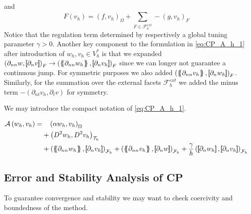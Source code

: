 and
\begin{equation}
\label{eq:CP_F_h}
F\left( v_{h} \right)  = \left( f, v_{h} \right) _{\Omega } +  \sum_ {F \in \mathcal{F}_{h} ^{ext}}^{} - \left(g, v_{h}  \right) _{F}
\end{equation}
Notice that the regulation term determined by respectively a global tuning parameter $\gamma >0 $. Another key component to the formulation
in \eqref{eq:CP_A_h_1} after introduction of $ w_{h}, v_{h} \in V^{*}_{h}$  is that we expanded $\left( \partial _{nn}w, \jump{ \partial _{n} v }  \right)_{F} \to \left( \mean{ \partial _{nn}w_{h} }  , \jump{ \partial _{n} v_{h} }  \right)_{F} $ since we can longer not guarantee a
continuous jump. For symmetric purposes we also added $ \left( \mean{ \partial _{nn} v_{h}}  , \jump{ \partial _{n} w_{h} }  \right)_{F} $. Similarly, for the summation over the external facets $\mathcal{F} _{h}^{ext}$ we added the minus term $- \left( \partial
_{nt} v_{h} , \partial _{t}v \right) $ for symmetry.

We may introduce the compact notation of \eqref{eq:CP_A_h_1}.

\begin{equation}
\label{eq:CP_A_h}
\begin{split}
\mathcal{A} \left( w_{h}, v_{h} \right)   =&
  \quad  \left( \alpha  w_{h}, v_{h} \right) _{\Omega }\\
&  +  \left( D^2 w_{h}, D^2v_{h} \right) _{\mathcal{T} _{h}} \\
 & +
  \left( \mean{  \partial _{n n} w_{h} }, \jump{ \partial _{n }v_{h}} \right)_{\mathcal{F}_{h}}  +
 \left( \mean{ \partial _{n n} v_{h} }, \jump{ \partial _{n}w }      \right)_{\mathcal{F}_{h}}
+ \frac{\gamma }{h}  \left( \jump{ \partial _{n} w_{h}}, \jump{ \partial _{n} v_{h}   }   \right)_{\mathcal{F}_{h}}
\end{split}
\end{equation}


\subsection{Error and Stability Analysis of CP}%
\label{sub:error_and_stability_analysis_of_c0ip}

To guarantee convergence and stability we may want to check coercivity and boundedness of the method.

